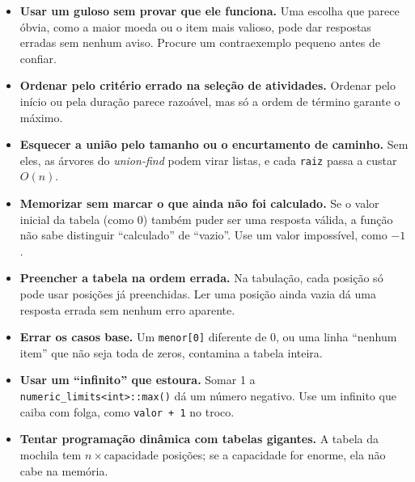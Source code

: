 \begin{itemize}
  \item \textbf{Usar um guloso sem provar que ele funciona.} Uma escolha que parece óbvia, como a maior moeda ou o item mais valioso, pode dar respostas erradas sem nenhum aviso. Procure um contraexemplo pequeno antes de confiar.
  \item \textbf{Ordenar pelo critério errado na seleção de atividades.} Ordenar pelo início ou pela duração parece razoável, mas só a ordem de término garante o máximo.
  \item \textbf{Esquecer a união pelo tamanho ou o encurtamento de caminho.} Sem eles, as árvores do \textit{union-find} podem virar listas, e cada \texttt{raiz} passa a custar $O(n)$.
  \item \textbf{Memorizar sem marcar o que ainda não foi calculado.} Se o valor inicial da tabela (como 0) também puder ser uma resposta válida, a função não sabe distinguir ``calculado'' de ``vazio''. Use um valor impossível, como $-1$.
  \item \textbf{Preencher a tabela na ordem errada.} Na tabulação, cada posição só pode usar posições já preenchidas. Ler uma posição ainda vazia dá uma resposta errada sem nenhum erro aparente.
  \item \textbf{Errar os casos base.} Um \texttt{menor[0]} diferente de 0, ou uma linha ``nenhum item'' que não seja toda de zeros, contamina a tabela inteira.
  \item \textbf{Usar um ``infinito'' que estoura.} Somar 1 a \texttt{numeric\_limits<int>::max()} dá um número negativo. Use um infinito que caiba com folga, como \texttt{valor + 1} no troco.
  \item \textbf{Tentar programação dinâmica com tabelas gigantes.} A tabela da mochila tem $n \times \text{capacidade}$ posições; se a capacidade for enorme, ela não cabe na memória.
\end{itemize}
